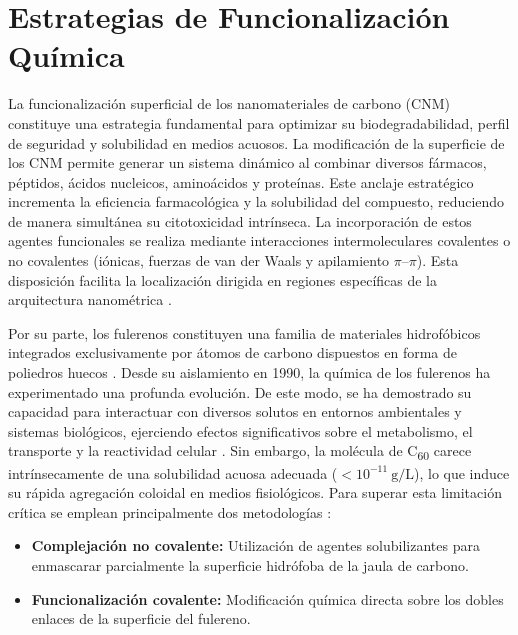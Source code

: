 \section{Estrategias de Funcionalización Química}

La funcionalización superficial de los nanomateriales de carbono (CNM) constituye una estrategia fundamental para optimizar su biodegradabilidad, perfil de seguridad y solubilidad en medios acuosos. La modificación de la superficie de los CNM permite generar un sistema dinámico al combinar diversos fármacos, péptidos, ácidos nucleicos, aminoácidos y proteínas. Este anclaje estratégico incrementa la eficiencia farmacológica y la solubilidad del compuesto, reduciendo de manera simultánea su citotoxicidad intrínseca. La incorporación de estos agentes funcionales se realiza mediante interacciones intermoleculares covalentes o no covalentes (iónicas, fuerzas de van der Waals y apilamiento $\pi$--$\pi$). Esta disposición facilita la localización dirigida en regiones específicas de la arquitectura nanométrica \cite{gaur2021biomedical}.

Por su parte, los fulerenos constituyen una familia de materiales hidrofóbicos integrados exclusivamente por átomos de carbono dispuestos en forma de poliedros huecos \cite{sharoyko2021biologically}. %
 Desde su aislamiento en 1990, la química de los fulerenos ha experimentado una profunda evolución. De este modo, se ha demostrado su capacidad para interactuar con diversos solutos en entornos ambientales y sistemas biológicos, ejerciendo efectos significativos sobre el metabolismo, el transporte y la reactividad celular \cite{ chang2024recent, bai2024research}. Sin embargo, la molécula de C\textsubscript{60} carece intrínsecamente de una solubilidad acuosa adecuada ($< 10^{-11}\ \text{g/L}$), lo que induce su rápida agregación coloidal en medios fisiológicos. Para superar esta limitación crítica se emplean principalmente dos metodologías \cite{sosnowska2019mechano}:

\begin{itemize}
    \item \textbf{Complejación no covalente:} Utilización de agentes solubilizantes para enmascarar parcialmente la superficie hidrófoba de la jaula de carbono.
    \item \textbf{Funcionalización covalente:} Modificación química directa sobre los dobles enlaces de la superficie del fulereno.
\end{itemize}

